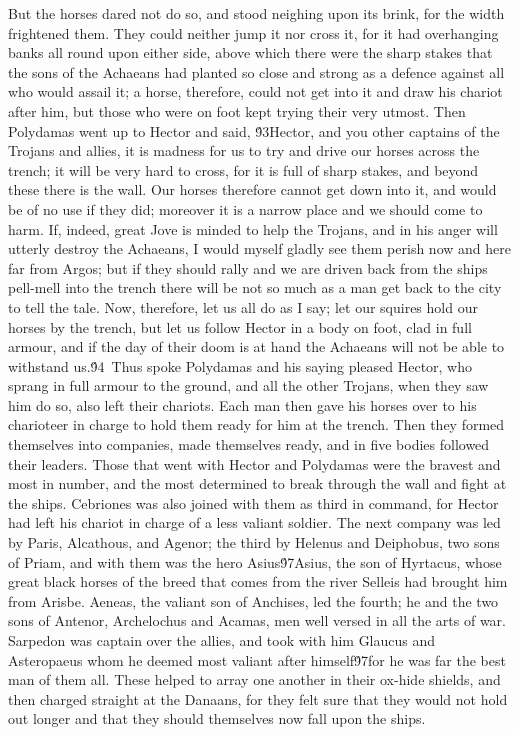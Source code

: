{But the horses dared not do so, and stood neighing upon its brink, for the width frightened them. They could neither jump it nor cross it, for it had overhanging banks all round upon either side, above which there were the sharp stakes that the sons of the Achaeans had planted so close and strong as a defence against all who would assail it; a horse, therefore, could not get into it and draw his chariot after him, but those who were on foot kept trying their very utmost. Then Polydamas went up to Hector and said, \'93Hector, and you other captains of the Trojans and allies, it is madness for us to try and drive our horses across the trench; it will be very hard to cross, for it is full of sharp stakes, and beyond these there is the wall. Our horses therefore cannot get down into it, and would be of no use if they did; moreover it is a narrow place and we should come to harm. If, indeed, great Jove is minded to help the Trojans, and in his anger will utterly destroy the Achaeans, I would myself gladly see them perish now and here far from Argos; but if they should rally and we are driven back from the ships pell-mell into the trench there will be not so much as a man get back to the city to tell the tale. Now, therefore, let us all do as I say; let our squires hold our horses by the trench, but let us follow Hector in a body on foot, clad in full armour, and if the day of their doom is at hand the Achaeans will not be able to withstand us.\'94\
Thus spoke Polydamas and his saying pleased Hector, who sprang in full armour to the ground, and all the other Trojans, when they saw him do so, also left their chariots. Each man then gave his horses over to his charioteer in charge to hold them ready for him at the trench. Then they formed themselves into companies, made themselves ready, and in five bodies followed their leaders. Those that went with Hector and Polydamas were the bravest and most in number, and the most determined to break through the wall and fight at the ships. Cebriones was also joined with them as third in command, for Hector had left his chariot in charge of a less valiant soldier. The next company was led by Paris, Alcathous, and Agenor; the third by Helenus and Deiphobus, two sons of Priam, and with them was the hero Asius\'97Asius, the son of Hyrtacus, whose great black horses of the breed that comes from the river Selleis had brought him from Arisbe. Aeneas, the valiant son of Anchises, led the fourth; he and the two sons of Antenor, Archelochus and Acamas, men well versed in all the arts of war. Sarpedon was captain over the allies, and took with him Glaucus and Asteropaeus whom he deemed most valiant after himself\'97for he was far the best man of them all. These helped to array one another in their ox-hide shields, and then charged straight at the Danaans, for they felt sure that they would not hold out longer and that they should themselves now fall upon the ships.\
}

